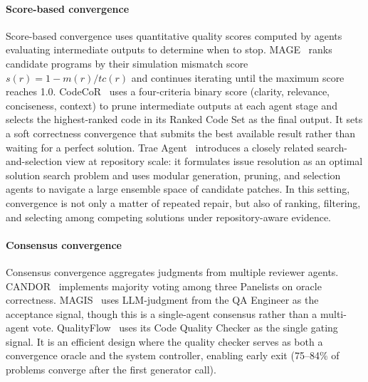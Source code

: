 \paragraph{Score-based convergence} Score-based convergence uses
quantitative quality scores computed by agents evaluating
intermediate outputs to determine when to stop.
MAGE~\cite{Zhao2024MAGE} ranks candidate programs by their
simulation mismatch score $s(r) = 1 - m(r) / tc(r)$ and
continues iterating until the maximum score reaches 1.0.
CodeCoR~\cite{Pan2025CodeCoR} uses a four-criteria binary score
(clarity, relevance, conciseness, context) to prune intermediate
outputs at each agent stage and selects the highest-ranked code
in its Ranked Code Set as the final output. It sets a soft
correctness convergence that submits the best available result
rather than waiting for a perfect solution. Trae Agent~\cite{gao2025traeagent} introduces a closely related
search-and-selection view at repository scale: it formulates
issue resolution as an optimal solution search problem and uses
modular generation, pruning, and selection agents to navigate a
large ensemble space of candidate patches. In this setting,
convergence is not only a matter of repeated repair, but also of
ranking, filtering, and selecting among competing solutions under
repository-aware evidence.

\paragraph{Consensus convergence} Consensus convergence aggregates
judgments from multiple reviewer agents.
CANDOR~\cite{Xu2025Hallucination} implements majority voting
among three Panelists on oracle correctness.
MAGIS~\cite{Tao2024Magis} uses LLM-judgment from the QA Engineer
as the acceptance signal, though this is a single-agent consensus
rather than a multi-agent vote. QualityFlow~\cite{Hu2025QualityFlow}
uses its Code Quality Checker as the single gating signal. It is
an efficient design where the quality checker serves as both a
convergence oracle and the system controller, enabling early exit
(75--84\% of problems converge after the first generator call).


